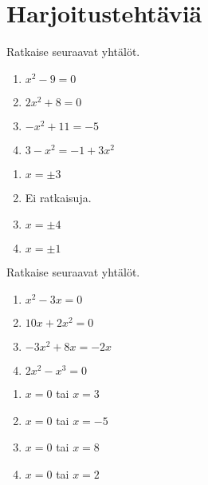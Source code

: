 \section{Harjoitustehtäviä}

\begin{tehtava}
    Ratkaise seuraavat yhtälöt.
    \begin{enumerate}
        \item $x^2 - 9 = 0$
        \item $2x^2 + 8 = 0$
        \item $-x^2 + 11 = -5$
        \item $3 - x^2 = -1 + 3x^2$
    \end{enumerate}
    \begin{vastaus}
        \begin{enumerate}
            \item $x=\pm3$
            \item Ei ratkaisuja.
            \item $x=\pm4$
            \item $x=\pm1$
        \end{enumerate}
    \end{vastaus}
\end{tehtava}

\begin{tehtava}
    Ratkaise seuraavat yhtälöt.
    \begin{enumerate}
        \item $x^2 - 3x = 0$
        \item $10x + 2x^2 = 0$
        \item $-3x^2 + 8x = -2x$
        \item $2x^2 - x^3 = 0$
    \end{enumerate}
    \begin{vastaus}
        \begin{enumerate}
            \item $x=0$ tai $x=3$
            \item $x=0$ tai $x=-5$
            \item $x=0$ tai $x=8$
            \item $x=0$ tai $x=2$
        \end{enumerate}
    \end{vastaus}
\end{tehtava}

